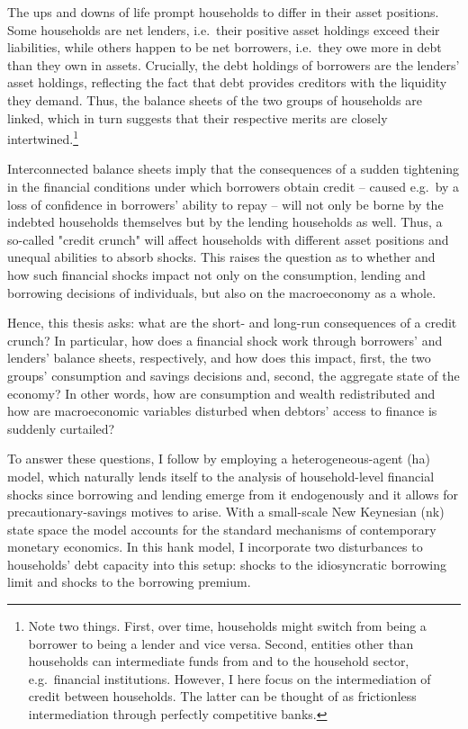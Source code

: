 \documentclass[a4paper,12pt]{article} %
\numberwithin{equation}{section} %
\numberwithin{figure}{section}
\numberwithin{table}{section}
\begin{document}
The ups and downs of life prompt households to differ in their asset positions. Some households are net lenders, i.e.~their positive asset holdings exceed their liabilities, while others happen to be net borrowers, i.e.~they owe more in debt than they own in assets. Crucially, the debt holdings of borrowers are the lenders' asset holdings, reflecting the fact that debt provides creditors with the liquidity they demand. Thus, the balance sheets of the two groups of households are linked, which in turn suggests that their respective merits are closely intertwined.\footnote{Note two things. First, over time, households might switch from being a borrower to being a lender and vice versa. Second, entities other than households can intermediate funds from and to the household sector, e.g.~financial institutions. However, I here focus on the intermediation of credit between households. The latter can be thought of as frictionless intermediation through perfectly competitive banks.}

Interconnected balance sheets imply that the consequences of a sudden tightening in the financial conditions under which borrowers obtain credit -- caused e.g.~by a loss of confidence in borrowers' ability to repay -- will not only be borne by the indebted households themselves but by the lending households as well. Thus, a so-called "credit crunch" will affect households with different asset positions and unequal abilities to absorb shocks. This raises the question as to whether and how such financial shocks impact not only on the consumption, lending and borrowing decisions of individuals, but also on the macroeconomy as a whole. 

Hence, this thesis asks: what are the short- and long-run consequences of a credit crunch? In particular, how does a financial shock work through borrowers' and lenders' balance sheets, respectively, and how does this impact, first, the two groups' consumption and savings decisions and, second, the aggregate state of the economy? In other words, how are consumption and wealth redistributed and how are macroeconomic variables disturbed when debtors' access to finance is suddenly curtailed?

To answer these questions, I follow \textcite{gl2017} by employing a heterogeneous-agent (\Gls{ha}) model, which naturally lends itself to the analysis of household-level financial shocks since borrowing and lending emerge from it endogenously and it allows for precautionary-savings motives to arise. With a small-scale New Keynesian (\Gls{nk}) state space the model accounts for the standard mechanisms of contemporary monetary economics. In this \Gls{hank} model, I incorporate two disturbances to households' debt capacity into this setup: shocks to the idiosyncratic borrowing limit and shocks to the borrowing premium. 
\end{document}
